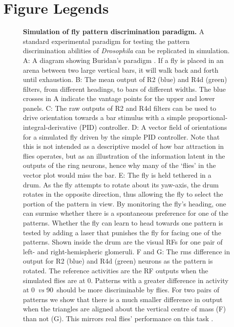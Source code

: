 \documentclass[10pt]{article}
\begin{document}


\section*{Figure Legends}
%
\begin{figure}
	\caption{
		{\bf Simulation of fly pattern discrimination paradigm.}
		A standard experimental paradigm for testing the pattern discrimination abilities of \emph{Drosophila} \cite{Ernst1999} can be replicated in simulation.
		A: A diagram showing Buridan's paradigm \protect\cite{Gotz1980,Bulthoff1982}. If a fly is placed in an arena between two large vertical bars, it will walk back and forth until exhaustion.
		B: The mean output of R2 (blue) and R4d (green) filters, from different headings, to bars of different widths. The blue crosses in A indicate the vantage points for the upper and lower panels.
		C: The raw outputs of R2 and R4d filters can be used to drive orientation towards a bar stimulus with a simple
		proportional-integral-derivative (PID) controller.
		D: A vector field of orientations for a simulated fly driven by the simple PID controller.
		Note that this is not intended as a descriptive model of how bar attraction in flies operates, but as an illustration of the information latent in the outputs of the ring neurons, hence why many of the `flies' in the vector plot would miss the bar.
		E: The fly is held tethered in a drum. As the fly attempts to rotate about its yaw-axis, the drum rotates in the opposite direction, thus allowing the fly to select the portion of the pattern in view.
		By monitoring the fly's heading, one can surmise whether there is a spontaneous preference for one of the patterns.
		Whether the fly can learn to head towards one pattern is tested by adding a laser that punishes the fly for facing one of the patterns.
		Shown inside the drum are the visual \acp{RF} for one pair of left- and right-hemispheric glomeruli.
		F and G: The \ac{rms} difference in output for R2 (blue) and R4d (green) neurons as the pattern is rotated.
		The reference activities are the \ac{RF} outputs when the simulated flies are at 0\degree.
		Patterns with a greater difference in activity at 0\degree\ \emph{vs} 90\degree\ should be more discriminable by flies.
		For two pairs of patterns we show that there is a much smaller difference in output when the triangles are aligned about the vertical centre of mass (F) than not (G).
		This mirrors real flies' performance on this task \cite{Ernst1999}.
	}
	\label{fig:recap}
\end{figure}
\end{document}

